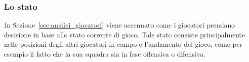 %

%

\subsubsection{Lo stato}
\label{sec:entita_coinvolte_stato}

In Sezione~\ref{sec:analisi_giocatori} viene accennato come i giocatori prendano decisione in base allo stato corrente di gioco. Tale stato consiste principalmente nelle posizioni degli altri giocatori in campo e l'andamento del gioco, come per esempio il fatto che la sua squadra sia in fase offensiva o difensiva.\\

